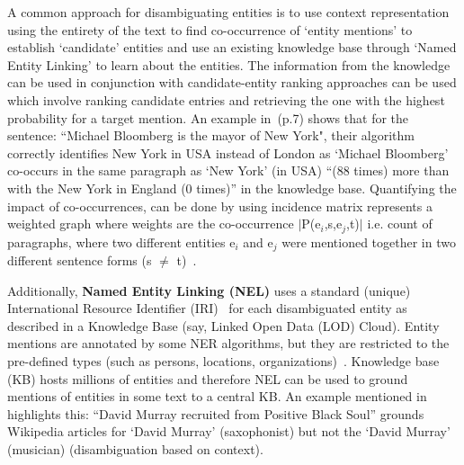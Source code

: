 A common approach for disambiguating entities is to use context representation using the entirety of the text to find co-occurrence of `entity mentions' to establish `candidate' entities and use an existing knowledge base through `Named Entity Linking' to learn about the entities. The information from the knowledge can be used in conjunction with candidate-entity ranking approaches can be used which involve ranking candidate entries and retrieving the one with the highest probability for a target mention. 
An example in~\cite{ned}(p.7) shows that for the sentence: ``Michael Bloomberg is the mayor of New York", their algorithm correctly identifies New York in USA instead of London as `Michael Bloomberg' co-occurs in the same paragraph as `New York' (in USA) ``(88 times) more than with the New York in England (0 times)'' in the knowledge base. Quantifying  the impact of co-occurrences, can be done by using incidence matrix represents a weighted graph where weights are the co-occurrence $|$P(e$_{i}$,s,e$_{j}$,t)$|$ i.e. count of paragraphs, where two different entities e$_{i}$ and e$_{j}$ were mentioned together in two different sentence forms (s $\neq$ t)~\cite{ned}. 

Additionally, \textbf{Named Entity Linking (NEL)} uses a standard (unique) International Resource Identifier (IRI)~\cite{internationalized} for each disambiguated entity as described in a Knowledge Base (say, Linked Open Data (LOD) Cloud). Entity mentions are annotated by some NER algorithms, but they are restricted to the pre-defined types (such as persons, locations, organizations)~\cite{ieee_named_entity}. Knowledge base (KB) hosts millions of entities and therefore NEL can be used to ground mentions of entities in some text to a central KB. An example mentioned in~\cite{nel} highlights this: ``David Murray recruited from Positive Black Soul'' grounds Wikipedia articles for `David Murray' (saxophonist) but not the `David Murray' (musician) (disambiguation based on context). 
    



